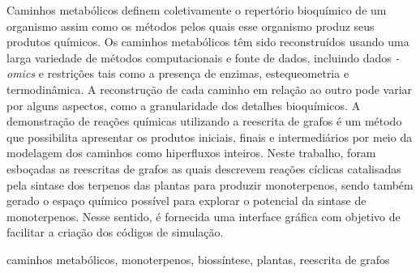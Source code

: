 Caminhos metabólicos definem coletivamente o repertório bioquímico de um organismo assim como os métodos pelos quais esse organismo produz seus produtos químicos. Os caminhos metabólicos têm sido reconstruídos usando uma larga variedade de métodos computacionais e fonte de dados, incluindo dados  {\it -omics} e restrições tais como a presença de enzimas, estequeometria e termodinâmica. A reconstrução de cada caminho em relação ao outro pode variar por alguns aspectos, como a granularidade dos detalhes bioquímicos. A demonstração de reações químicas utilizando a reescrita de grafos é um método que possibilita apresentar os produtos iniciais, finais e intermediários por meio da modelagem dos caminhos como hiperfluxos inteiros. Neste trabalho, foram esboçadas as reescritas de grafos as quais descrevem reações cíclicas catalisadas pela sintase dos terpenos das plantas para produzir monoterpenos, sendo também gerado o espaço químico possível para explorar o potencial da sintase de monoterpenos. Nesse sentido, é fornecida uma interface gráfica com objetivo de facilitar a criação dos códigos de simulação.

\begin{keywords}
	caminhos metabólicos, monoterpenos, biossíntese, plantas, reescrita de grafos
\end{keywords}